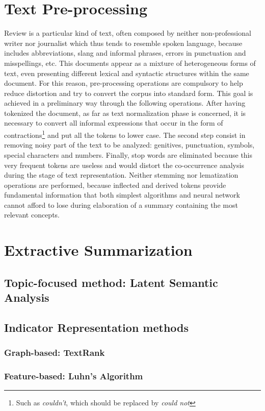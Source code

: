 \documentclass[fleqn,10pt]{SelfArx} %
\begin{document}
\section{Text Pre-processing}
Review is a particular kind of text, often composed by neither non-professional writer nor journalist which thus tends to resemble spoken language, because includes abbreviations, slang and informal phrases, errors in punctuation and misspellings, etc. This documents appear as a mixture of heterogeneous forms of text, even presenting different lexical and syntactic structures within the same document. For this reason, pre-processing operations are compulsory to help reduce distortion and try to convert the corpus into standard form. This goal is achieved in a preliminary way through the following operations. After having tokenized the document, as far as text normalization phase is concerned, it is necessary to convert all informal expressions that occur in the form of contractions\footnote{Such as \textit{couldn't}, which should be replaced by \textit{could not}} and put all the tokens to lower case. The second step consist in removing noisy part of the text to be analyzed: genitives, punctuation, symbols, special characters and numbers. Finally, stop words are eliminated because this very frequent tokens are useless and would distort the co-occurrence analysis during the stage of text representation. Neither stemming nor lematization operations are performed, because inflected and derived tokens provide fundamental information that both simplest algorithms and neural network cannot afford to lose during elaboration of a summary containing the most relevant concepts.
\section{Extractive Summarization}

\subsection{Topic-focused method: Latent Semantic Analysis}
\subsection{Indicator Representation methods}
\subsubsection{Graph-based: TextRank}
\subsubsection{Feature-based: Luhn's Algorithm}
\end{document}
